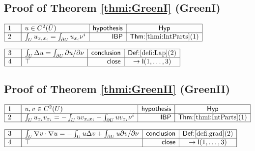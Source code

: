 \documentclass[11pt,reqno]{amsart}
\begin{document}
	\subsection*{Proof of Theorem \protect\ref{thmi:GreenI} (\textsf{GreenI})}
	\noindent$\begin{array}{|m{0.5cm}|l|r|c|}
	\hline
	1 & u\in C^{2}(\bar{U}) & \mathsf{hypothesis} & \mathsf{Hyp} \\ \hline
	2 & \int_{U}u_{x_{i}x_{i}}=\int_{\partial U}u_{x_{i}}\nu^{i} & \mathsf{IBP} & \textsf{Thm:}\ref{thmi:IntParts}(1) \\ \hline
	\end{array}$
	\par\nointerlineskip\noindent$\begin{array}{|m{0.5cm}|l|r|c|}
	\hline
	3 & \int_{U}\Delta u=\int_{\partial U}\partial u/\partial\nu & \mathsf{conclusion} & \textsf{Def:}\ref{defi:Lap}(2) \\ \hline
	4 & \top & \mathsf{close} & \to\mathsf{I}(1,\dots,3) \\ \hline
	\end{array}$
	\medskip
	
	\subsection*{Proof of Theorem \protect\ref{thmi:GreenII} (\textsf{GreenII})}
	\noindent$\begin{array}{|m{0.5cm}|l|r|c|}
	\hline
	1 & u,v\in C^{2}(\bar{U}) & \mathsf{hypothesis} & \mathsf{Hyp} \\ \hline
	2 & \int_{U}u_{x_{i}}v_{x_{i}}=-\int_{U}uv_{x_{i}x_{i}}+\int_{\partial U}uv_{x_{i}}\nu^{i} & \mathsf{IBP} & \textsf{Thm:}\ref{thmi:IntParts}(1) \\ \hline
	\end{array}$
	\par\nointerlineskip\noindent$\begin{array}{|m{0.5cm}|l|r|c|}
	\hline
	3 & \int_{U}\nabla v\cdot\nabla u=-\int_{U}u\Delta v+\int_{\partial U}u\partial v/\partial\nu & \mathsf{conclusion} & \textsf{Def:}\ref{defi:grad}(2) \\ \hline
	4 & \top & \mathsf{close} & \to\mathsf{I}(1,\dots,3) \\ \hline
	\end{array}$
	\medskip
	
\end{document}
